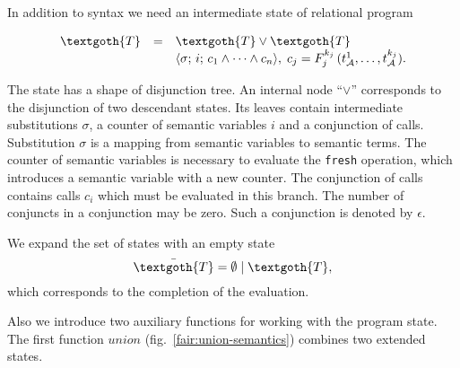 
In addition to syntax we need an intermediate state of relational program

\[
\begin{array}{rcl}
  \textgoth{T} & = & \textgoth{T} \lor \textgoth{T}\\
               &   & \inbr{\sigma;\, i;\, c_1 \land \dots \land c_n},\; c_j = F_j^{k_j}\,(t_\mathcal{A}^1,\dots,t_\mathcal{A}^{k_j}).
\end{array}
\]

The state has a shape of disjunction tree. An internal node ``$\lor$'' corresponds to the disjunction of two descendant states.
Its leaves contain intermediate substitutions $\sigma$, a counter of semantic variables $i$ and a conjunction of calls. Substitution $\sigma$ is a
mapping from semantic variables to semantic terms. The counter of semantic variables is necessary to evaluate the \lstinline{fresh} operation,
which introduces a semantic variable with a new counter. The conjunction of calls contains calls $c_i$ which must be evaluated in this branch. The number of conjuncts in a conjunction may be zero. Such a conjunction is denoted by $\epsilon$.


We expand the set of states with an empty state
\[
\bar{\textgoth{T}} = \emptyset \mid \textgoth{T},
\]
which corresponds to the completion of the evaluation.

Also we introduce two auxiliary functions for working with the program state. The first function $union$ (fig.~\ref{fair:union-semantics}) combines two extended states.

